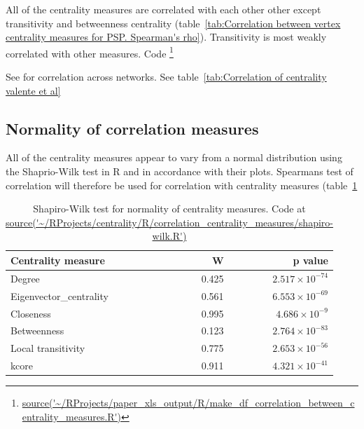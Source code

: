 All of the centrality measures are correlated with each other other except transitivity and betweenness centrality  (table~\ref{tab:Correlation between vertex centrality measures for PSP. Spearman's rho}). Transitivity is most weakly correlated with other measures. Code \footnote{\url{source('~/RProjects/paper_xls_output/R/make_df_correlation_between_centrality_measures.R')}}



See \cite{oldham2019consistency} for correlation across networks. See table~\ref{tab:Correlation of centrality valente et al}

\subsection{Normality of correlation measures}
All of the centrality measures appear to vary from a normal distribution using the Shaprio-Wilk test in R and in accordance with their plots. Spearmans test of correlation will therefore be used for correlation with centrality measures (table~\ref{Table:Test for normality (Shapiro-Wilk) for centrality measures of PSP}

\begin{table}[ht]
\centering
\begin{tabular}{lrr}
  \hline
Centrality measure & W & p value \\ 
  \hline
Degree & 0.425 & $2.517 \times 10^{-74}$ \\ 
  Eigenvector\_centrality & 0.561 & $6.553 \times 10^{-69}$ \\ 
  Closeness & 0.995 & $4.686 \times 10^{-9}$ \\ 
  Betweenness & 0.123 & $2.764 \times 10^{-83}$ \\ 
  Local transitivity & 0.775 & $2.653 \times 10^{-56}$ \\ 
  kcore & 0.911 & $4.321 \times 10^{-41}$ \\ 
   \hline
\end{tabular}
\caption{Shapiro-Wilk test for normality of centrality measures. Code at \url{source('~/RProjects/centrality/R/correlation_centrality_measures/shapiro-wilk.R')}} 
\label{Table:Test for normality (Shapiro-Wilk) for centrality measures of PSP}
\end{table}

